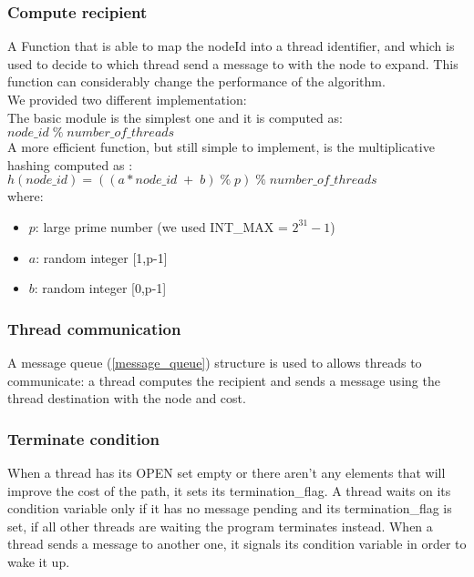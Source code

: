 \subsubsection{Compute recipient}
\label{compute_reci}

A Function that is able to map the nodeId into a thread identifier, and which is used to decide to which thread send a message to with the node to expand.
This function can considerably change the performance of the algorithm.
\\ We provided two different implementation:
\\
The basic module is the simplest one and it is computed as: \\
$node\_id \; \% \;  number\_of\_threads$
\\
A more efficient function, but still simple to implement, is the multiplicative hashing computed as \cite{bibVideoMulHash}: \\
$ h(node\_id) =((a*node\_id \; + \; b) \; \% \; p) \; \% \; number\_of\_threads $  
\\ where:
\begin{itemize}
    \item $p$: large prime number (we used INT\_MAX =  $ 2^{31}-1 $)
    \item $a$: random integer [1,p-1]
    \item $b$: random integer [0,p-1]
\end{itemize}


\subsubsection{Thread communication}
\label{thread_buf}

A message queue (\ref{message_queue}) structure is used to allows threads to communicate: a thread computes the recipient and sends a message using the thread destination with the node and cost. 

\subsubsection{Terminate condition}
\label{terminate}

When a thread has its OPEN set empty or there aren't any elements that will improve the cost of the path, it sets its termination\_flag.
A thread waits on its condition variable only if it has no message pending and its termination\_flag is set, if all other threads are waiting the program terminates instead.
When a thread sends a message to another one, it signals its condition variable in order to wake it up.

